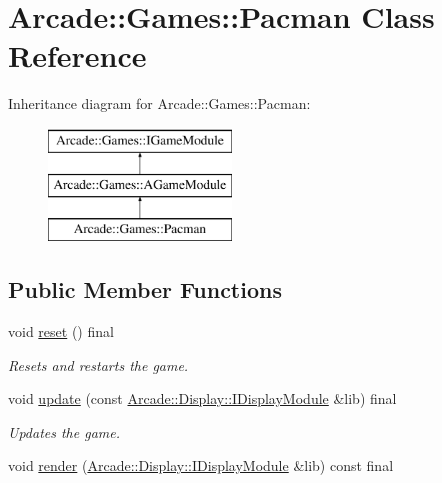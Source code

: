 \hypertarget{classArcade_1_1Games_1_1Pacman}{}\section{Arcade\+::Games\+::Pacman Class Reference}
\label{classArcade_1_1Games_1_1Pacman}
Inheritance diagram for Arcade\+::Games\+::Pacman\+:\begin{figure}[H]
\begin{center}
\leavevmode
\includegraphics[height=3.000000cm]{classArcade_1_1Games_1_1Pacman}
\end{center}
\end{figure}
\subsection*{Public Member Functions}
\begin{DoxyCompactItemize}
\item 
\mbox{\label{classArcade_1_1Games_1_1Pacman_ab22a7f3125e07169dc326eb3b89dba94}} 
void \mbox{\hyperlink{classArcade_1_1Games_1_1Pacman_ab22a7f3125e07169dc326eb3b89dba94}{reset}} () final
\begin{DoxyCompactList}\small\item\em Resets and restarts the game. \end{DoxyCompactList}\item 
void \mbox{\hyperlink{classArcade_1_1Games_1_1Pacman_aa6bc227c3f14cc8d66d11f2d32bed3ec}{update}} (const \mbox{\hyperlink{classArcade_1_1Display_1_1IDisplayModule}{Arcade\+::\+Display\+::\+I\+Display\+Module}} \&lib) final
\begin{DoxyCompactList}\small\item\em Updates the game. \end{DoxyCompactList}\item 
void \mbox{\hyperlink{classArcade_1_1Games_1_1Pacman_ab1a7408f265efbef12b4f9d1a6fb4512}{render}} (\mbox{\hyperlink{classArcade_1_1Display_1_1IDisplayModule}{Arcade\+::\+Display\+::\+I\+Display\+Module}} \&lib) const final
\end{DoxyCompactItemize}
